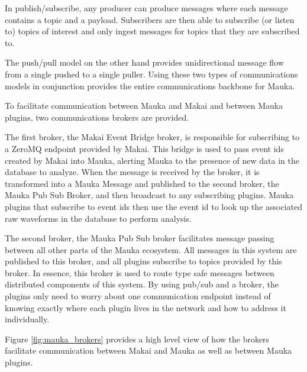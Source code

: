 In publish/subscribe, any producer can produce messages where each message contains a topic and a payload. Subscribers are then able to subscribe (or listen to) topics of interest and only ingest messages for topics that they are subscribed to.

The push/pull model on the other hand provides unidirectional message flow from a single pushed to a single puller. Using these two types of communications models in conjunction provides the entire communications backbone for Mauka.

To facilitate communication between Mauka and Makai and between Mauka plugins, two communications brokers are provided. 

The first broker, the Makai Event Bridge broker, is responsible for subscribing to a ZeroMQ endpoint provided by Makai. This bridge is used to pass event ids created by Makai into Mauka, alerting Mauka to the presence of new data in the database to analyze. When the message is received by the broker, it is transformed into a Mauka Message and published to the second broker, the Mauka Pub Sub Broker, and then broadcast to any subscribing plugins. Mauka plugins that subscribe to event ids then use the event id to look up the associated raw waveforms in the database to perform analysis.

The second broker, the Mauka Pub Sub broker facilitates message passing between all other parts of the Mauka ecosystem. All messages in this system are published to this broker, and all plugins subscribe to topics provided by this broker. In essence, this broker is used to route type safe messages between distributed components of this system. By using pub/sub and a broker, the plugins only need to worry about one communication endpoint instead of knowing exactly where each plugin lives in the network and how to address it individually.

Figure \ref{fig:mauka_brokers} provides a high level view of how the brokers facilitate communication between Makai and Mauka as well as between Mauka plugins.

